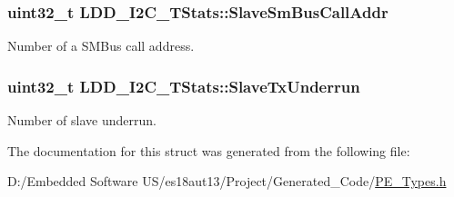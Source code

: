 \subsubsection[{Slave\+Sm\+Bus\+Call\+Addr}]{\setlength{\rightskip}{0pt plus 5cm}uint32\+\_\+t L\+D\+D\+\_\+\+I2\+C\+\_\+\+T\+Stats\+::\+Slave\+Sm\+Bus\+Call\+Addr}\label{struct_l_d_d___i2_c___t_stats_a134cb9fb9e37217e70e8a93924bca300}
Number of a S\+M\+Bus call address. \hypertarget{struct_l_d_d___i2_c___t_stats_add2f9914a1ea98c3bf86c0cab84e6a8c}{}
\subsubsection[{Slave\+Tx\+Underrun}]{\setlength{\rightskip}{0pt plus 5cm}uint32\+\_\+t L\+D\+D\+\_\+\+I2\+C\+\_\+\+T\+Stats\+::\+Slave\+Tx\+Underrun}\label{struct_l_d_d___i2_c___t_stats_add2f9914a1ea98c3bf86c0cab84e6a8c}
Number of slave underrun. 

The documentation for this struct was generated from the following file\+:\begin{DoxyCompactItemize}
\item 
D\+:/\+Embedded Software U\+S/es18aut13/\+Project/\+Generated\+\_\+\+Code/\hyperlink{_p_e___types_8h}{P\+E\+\_\+\+Types.\+h}\end{DoxyCompactItemize}
